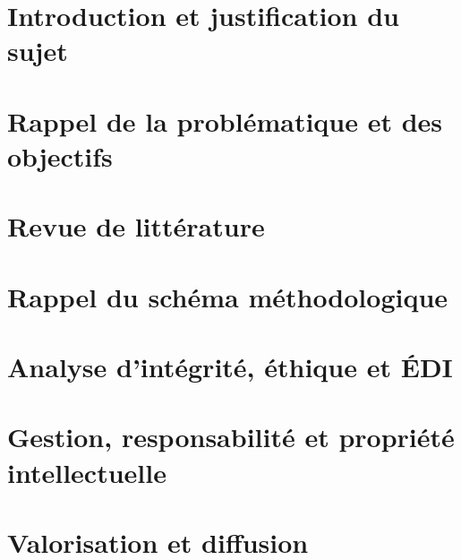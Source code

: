 \documentclass[12pt,letterpaper]{article}
\begin{document}
\hypersetup{pageanchor=false}

\hypersetup{pageanchor=true}

\begin{singlespace}
\tableofcontents
\clearpage
\listesigles
\end{singlespace}
\clearpage

\label{debut-corps}

\section{Introduction et justification du sujet}
\label{sec:introduction}


\section{Rappel de la problématique et des objectifs}
\label{sec:problematique}


\section{Revue de littérature}
\label{sec:revue}


\section{Rappel du schéma méthodologique}
\label{sec:methodologie}


\section{Analyse d'intégrité, éthique et ÉDI}
\label{sec:ethique}


\section{Gestion, responsabilité et propriété intellectuelle}
\label{sec:gestion-pi}


\section{Valorisation et diffusion}
\label{sec:valorisation}

\end{document}
